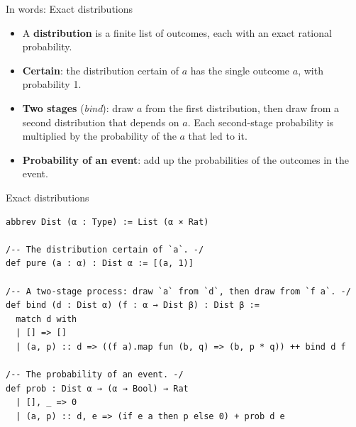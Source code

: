 \documentclass[aspectratio=169,11pt]{beamer}
\begin{document}
\begin{frame}{In words: Exact distributions}
  \begin{itemize}
    \item A \textbf{distribution} is a finite list of outcomes, each with an exact rational probability.
    \item \textbf{Certain}: the distribution certain of $a$ has the single outcome $a$, with probability 1.
    \item \textbf{Two stages} (\emph{bind}): draw $a$ from the first distribution, then draw from a second distribution that depends on $a$. Each second-stage probability is multiplied by the probability of the $a$ that led to it.
    \item \textbf{Probability of an event}: add up the probabilities of the outcomes in the event.
  \end{itemize}
\end{frame}


\begin{frame}[fragile]{Exact distributions}
\begin{Verbatim}
abbrev Dist (α : Type) := List (α × Rat)

/-- The distribution certain of `a`. -/
def pure (a : α) : Dist α := [(a, 1)]

/-- A two-stage process: draw `a` from `d`, then draw from `f a`. -/
def bind (d : Dist α) (f : α → Dist β) : Dist β :=
  match d with
  | [] => []
  | (a, p) :: d => ((f a).map fun (b, q) => (b, p * q)) ++ bind d f

/-- The probability of an event. -/
def prob : Dist α → (α → Bool) → Rat
  | [], _ => 0
  | (a, p) :: d, e => (if e a then p else 0) + prob d e
\end{Verbatim}
\end{frame}
\end{document}
